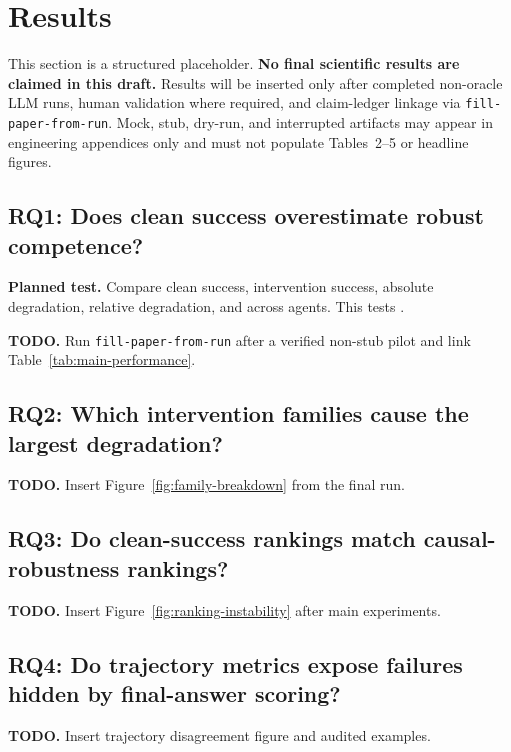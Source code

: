 \section{Results}

This section is a structured placeholder. \textbf{No final scientific results are claimed in this draft.} Results will be inserted only after completed non-oracle LLM runs, human validation where required, and claim-ledger linkage via \texttt{fill-paper-from-run}. Mock, stub, dry-run, and interrupted artifacts may appear in engineering appendices only and must not populate Tables~2--5 or headline figures.

\subsection{RQ1: Does clean success overestimate robust competence?}
\textbf{Planned test.} Compare clean success, intervention success, absolute degradation, relative degradation, and \acrs across agents. This tests .

\textbf{TODO.} Run \texttt{fill-paper-from-run} after a verified non-stub pilot and link Table~\ref{tab:main-performance}.

\subsection{RQ2: Which intervention families cause the largest degradation?}
\textbf{TODO.} Insert Figure~\ref{fig:family-breakdown} from the final run.

\subsection{RQ3: Do clean-success rankings match causal-robustness rankings?}
\textbf{TODO.} Insert Figure~\ref{fig:ranking-instability} after main experiments.

\subsection{RQ4: Do trajectory metrics expose failures hidden by final-answer scoring?}
\textbf{TODO.} Insert trajectory disagreement figure and audited examples.

